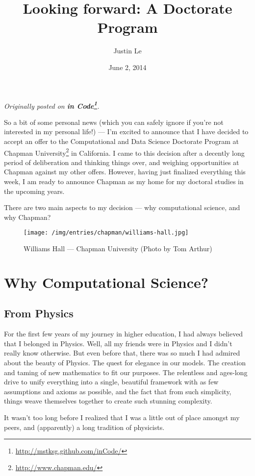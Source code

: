 \documentclass[]{article}
\title{Looking forward: A Doctorate Program}
\author{Justin Le}
\date{June 2, 2014}
\renewcommand{\href}[2]{#2\footnote{\url{#1}}}
\begin{document}
\maketitle

\emph{Originally posted on
\textbf{\href{http://mstksg.github.com/inCode/}{in Code}}.}

So a bit of some personal news (which you can safely ignore if you're
not interested in my personal life!) --- I'm excited to announce that I
have decided to accept an offer to the Computational and Data Science
Doctorate Program at \href{http://www.chapman.edu/}{Chapman University}
in California. I came to this decision after a decently long period of
deliberation and thinking things over, and weighing opportunities at
Chapman against my other offers. However, having just finalized
everything this week, I am ready to announce Chapman as my home for my
doctoral studies in the upcoming years.

There are two main aspects to my decision --- why computational science,
and why Chapman?

\begin{figure}[htbp]
\centering
\texttt{[image: /img/entries/chapman/williams-hall.jpg]}
\caption{Williams Hall --- Chapman University (Photo by Tom Arthur)}
\end{figure}

\section{Why Computational Science?}\label{why-computational-science}

\subsection{From Physics}\label{from-physics}

For the first few years of my journey in higher education, I had always
believed that I belonged in Physics. Well, all my friends were in
Physics and I didn't really know otherwise. But even before that, there
was so much I had admired about the beauty of Physics. The quest for
elegance in our models. The creation and taming of new mathematics to
fit our purposes. The relentless and ages-long drive to unify everything
into a single, beautiful framework with as few assumptions and axioms as
possible, and the fact that from such simplicity, things weave
themselves together to create such stunning complexity.

It wasn't too long before I realized that I was a little out of place
amongst my peers, and (apparently) a long tradition of physicists.
\end{document}
